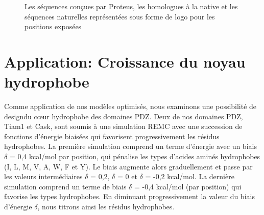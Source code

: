    \begin{figure}[!htbp]
     \caption{Les séquences conçues par Proteus, les homologues à la native et les séquences naturelles représentées sous forme de logo pour les positions exposées}
\label{logo:fullcutPDZ}
   \end{figure}
    
\section{Application: Croissance du noyau hydrophobe}
Comme application de nos modèles optimisés, nous examinons une possibilité de \og design\fg du cœur hydrophobe des domaines PDZ. Deux de nos domaines PDZ, Tiam1 et Cask, sont soumis à une simulation REMC avec une succession de fonctions d'énergie biaisées qui favorisent progressivement les résidus hydrophobes. La première simulation comprend un terme d'énergie avec un biais $\delta$ = 0,4 kcal/mol par position, qui pénalise les types d'acides aminés hydrophobes (I, L, M, V, A, W, F et Y). Le biais augmente alors graduellement et passe par les valeurs intermédiaires $\delta$ = 0,2, $\delta$ = 0 et $\delta$ = -0,2 kcal/mol. La dernière simulation comprend un terme de biais $\delta$ = -0,4 kcal/mol (par position) qui favorise les types hydrophobes. En diminuant progressivement la valeur du biais d'énergie $\delta$, nous \og titrons \fg ainsi les résidus hydrophobes.



